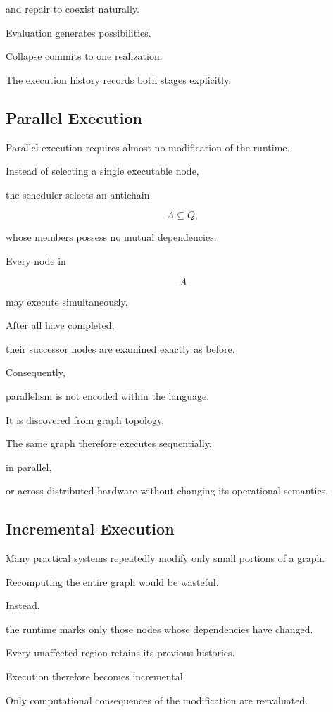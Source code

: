 \documentclass[12pt,oneside]{article}
\begin{document}
and repair to coexist naturally.

Evaluation generates possibilities.

Collapse commits to one realization.

The execution history records both stages explicitly.

\subsection{Parallel Execution}

Parallel execution requires almost no modification of the runtime.

Instead of selecting a single executable node,

the scheduler selects an antichain

\[
A
\subseteq
Q,
\]

whose members possess no mutual dependencies.

Every node in

\[
A
\]

may execute simultaneously.

After all have completed,

their successor nodes are examined exactly as before.

Consequently,

parallelism is not encoded within the language.

It is discovered from graph topology.

The same graph therefore executes sequentially,

in parallel,

or across distributed hardware without changing its operational semantics.

\subsection{Incremental Execution}

Many practical systems repeatedly modify only small portions of a graph.

Recomputing the entire graph would be wasteful.

Instead,

the runtime marks only those nodes whose dependencies have changed.

Every unaffected region retains its previous histories.

Execution therefore becomes incremental.

Only computational consequences of the modification are reevaluated.
\end{document}
